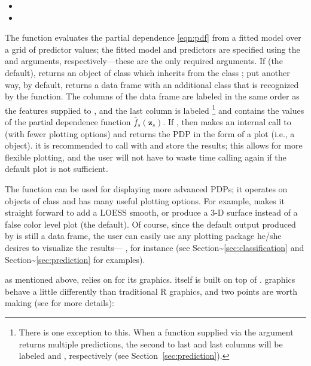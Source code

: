 \begin{itemize}
  \item {}
  \item {}
\end{itemize}

The  function evaluates the partial dependence
\eqref{eqn:pdf} from a fitted model over a grid of predictor values; the
fitted model and predictors are specified using the  and
 arguments, respectively---these are the only required
arguments. If  (the default),  returns
an object of class  which inherits from the class
; put another way, by default,  returns
a data frame with an additional class that is recognized by the
 function. The columns of the data frame are labeled
in the same order as the features supplied to , and the
last column is labeled
\footnote{There is one exception to this. When a function supplied via the  argument returns multiple predictions, the second to last and last columns will be labeled  and , respectively (see Section~\ref{sec:prediction}).}
and contains the values of the partial dependence function
\(\bar{f}_s\left(\boldsymbol{z}_s\right)\). If , then
 makes an internal call to  (with fewer
plotting options) and returns the PDP in the form of a 
plot (i.e., a  object).  it is recommended
to call  with  and store the results;
this allows for more flexible plotting, and the user will not have to
waste time calling  again if the default plot is not
sufficient.

The  function can be used for displaying more advanced
PDPs; it operates on objects of class  and has many
useful plotting options. For example,  makes it
straight forward to add a LOESS smooth, or produce a 3-D surface instead
of a false color level plot (the default). Of course, since the default
output produced by  is still a data frame, the user can
easily use any plotting package he/she desires to visualize the
results--- \citep{ggplot2-pkg}, for instance (see
Section\textasciitilde{}\ref{sec:classification} and
Section\textasciitilde{}\ref{sec:prediction} for examples).

 as mentioned above,  relies on  for
its graphics.  itself is built on top of 
\citep{grid-pkg}.  graphics behave a little differently than
traditional R graphics, and two points are worth making (see
 for more details):

